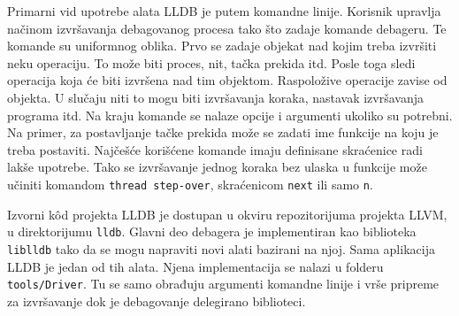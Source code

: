 \documentclass[12pt,oneside]{memoir}
\begin{document}
Primarni vid upotrebe alata LLDB je putem komandne linije.
Korisnik upravlja načinom izvršavanja debagovanog procesa tako što zadaje komande debageru.
Te komande su uniformnog oblika.
Prvo se zadaje objekat nad kojim treba izvršiti neku operaciju.
To može biti proces, nit, tačka prekida itd.
Posle toga sledi operacija koja će biti izvršena nad tim objektom.
Raspoložive operacije zavise od objekta.
U slučaju niti to mogu biti izvršavanja koraka, nastavak izvršavanja programa itd.
Na kraju komande se nalaze opcije i argumenti ukoliko su potrebni.
Na primer, za postavljanje tačke prekida može se zadati ime funkcije na koju je treba postaviti.
Najčešće korišćene komande imaju definisane skraćenice radi lakše upotrebe.
Tako se izvršavanje jednog koraka bez ulaska u funkcije može učiniti komandom \verb|thread step-over|, skraćenicom \verb|next| ili samo \verb|n|.



Izvorni k\^od projekta LLDB je dostupan u okviru repozitorijuma projekta LLVM, u direktorijumu \verb|lldb|.
Glavni deo debagera je implementiran kao biblioteka \verb|liblldb| tako da se mogu napraviti novi alati bazirani na njoj.
Sama aplikacija LLDB je jedan od tih alata.
Njena implementacija se nalazi u folderu \verb|tools/Driver|.
Tu se samo obrađuju argumenti komandne linije i vrše pripreme za izvršavanje dok je debagovanje delegirano biblioteci.
\end{document}
